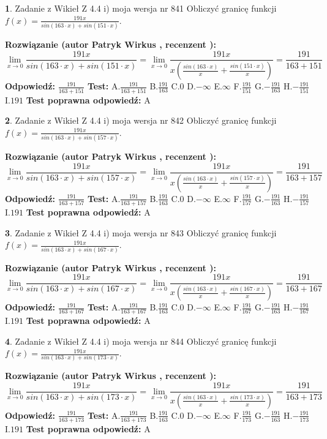 \documentclass[12pt, a4paper]{article}
\theoremstyle{definition} %
\newtheorem{zad}{}
\newcommand{\zadStart}[1]{\begin{zad}#1\newline}
\newcommand{\zadStop}{\end{zad}}
\newcommand{\rozwStart}[2]{\noindent \textbf{Rozwiązanie (autor #1 , recenzent #2): }\newline}
\newcommand{\rozwStop}{\newline}
\newcommand{\odpStart}{\noindent \textbf{Odpowiedź:}\newline}
\newcommand{\odpStop}{\newline}
\newcommand{\testStart}{\noindent \textbf{Test:}\newline}
\newcommand{\testStop}{\newline}
\newcommand{\kluczStart}{\noindent \textbf{Test poprawna odpowiedź:}\newline}
\newcommand{\kluczStop}{\newline}
\begin{document}
\zadStart{Zadanie z Wikieł Z 4.4 i) moja wersja nr 841}
Obliczyć granicę funkcji $f(x)=\frac{191x}{sin(163\cdot x) +sin(151\cdot x)}$.
\zadStop
\rozwStart{Patryk Wirkus}{}
$$\lim\limits_{x\to 0}\frac{191x}{sin(163\cdot x) +sin(151\cdot x)}=\lim\limits_{x\to 0}\frac{191x}{x(\frac{sin(163\cdot x)}{x}+\frac{sin(151\cdot x)}{x})}=\frac{191}{163+151}$$
\rozwStop
\odpStart
$\frac{191}{163+151}$
\odpStop
\testStart
A.$\frac{191}{163+151}$
B.$\frac{191}{163}$
C.$0$
D.$-\infty$
E.$\infty$
F.$\frac{191}{151}$
G.$-\frac{191}{163}$
H.$-\frac{191}{151}$
I.$191$
\testStop
\kluczStart
A
\kluczStop



\zadStart{Zadanie z Wikieł Z 4.4 i) moja wersja nr 842}
Obliczyć granicę funkcji $f(x)=\frac{191x}{sin(163\cdot x) +sin(157\cdot x)}$.
\zadStop
\rozwStart{Patryk Wirkus}{}
$$\lim\limits_{x\to 0}\frac{191x}{sin(163\cdot x) +sin(157\cdot x)}=\lim\limits_{x\to 0}\frac{191x}{x(\frac{sin(163\cdot x)}{x}+\frac{sin(157\cdot x)}{x})}=\frac{191}{163+157}$$
\rozwStop
\odpStart
$\frac{191}{163+157}$
\odpStop
\testStart
A.$\frac{191}{163+157}$
B.$\frac{191}{163}$
C.$0$
D.$-\infty$
E.$\infty$
F.$\frac{191}{157}$
G.$-\frac{191}{163}$
H.$-\frac{191}{157}$
I.$191$
\testStop
\kluczStart
A
\kluczStop



\zadStart{Zadanie z Wikieł Z 4.4 i) moja wersja nr 843}
Obliczyć granicę funkcji $f(x)=\frac{191x}{sin(163\cdot x) +sin(167\cdot x)}$.
\zadStop
\rozwStart{Patryk Wirkus}{}
$$\lim\limits_{x\to 0}\frac{191x}{sin(163\cdot x) +sin(167\cdot x)}=\lim\limits_{x\to 0}\frac{191x}{x(\frac{sin(163\cdot x)}{x}+\frac{sin(167\cdot x)}{x})}=\frac{191}{163+167}$$
\rozwStop
\odpStart
$\frac{191}{163+167}$
\odpStop
\testStart
A.$\frac{191}{163+167}$
B.$\frac{191}{163}$
C.$0$
D.$-\infty$
E.$\infty$
F.$\frac{191}{167}$
G.$-\frac{191}{163}$
H.$-\frac{191}{167}$
I.$191$
\testStop
\kluczStart
A
\kluczStop



\zadStart{Zadanie z Wikieł Z 4.4 i) moja wersja nr 844}
Obliczyć granicę funkcji $f(x)=\frac{191x}{sin(163\cdot x) +sin(173\cdot x)}$.
\zadStop
\rozwStart{Patryk Wirkus}{}
$$\lim\limits_{x\to 0}\frac{191x}{sin(163\cdot x) +sin(173\cdot x)}=\lim\limits_{x\to 0}\frac{191x}{x(\frac{sin(163\cdot x)}{x}+\frac{sin(173\cdot x)}{x})}=\frac{191}{163+173}$$
\rozwStop
\odpStart
$\frac{191}{163+173}$
\odpStop
\testStart
A.$\frac{191}{163+173}$
B.$\frac{191}{163}$
C.$0$
D.$-\infty$
E.$\infty$
F.$\frac{191}{173}$
G.$-\frac{191}{163}$
H.$-\frac{191}{173}$
I.$191$
\testStop
\kluczStart
A
\kluczStop
\end{document}

